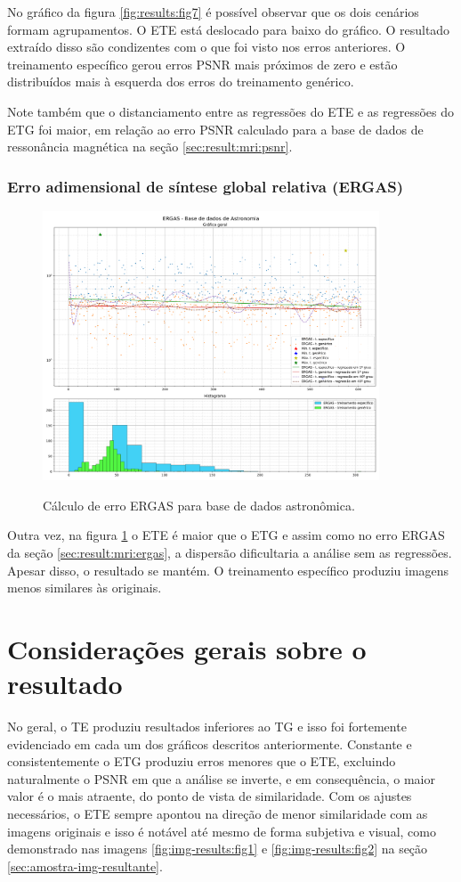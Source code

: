 No gráfico da figura \ref{fig:results:fig7} é possível observar que os dois cenários formam agrupamentos. O ETE está deslocado para baixo do gráfico. O resultado extraído disso são condizentes com o que foi visto nos erros anteriores. O treinamento específico gerou erros PSNR mais próximos de zero e estão distribuídos mais à esquerda dos erros do treinamento genérico.

Note também que o distanciamento entre as regressões do ETE e as regressões do ETG foi maior, em relação ao erro PSNR calculado para a base de dados de ressonância magnética na seção \ref{sec:result:mri:psnr}. 

\subsubsection{Erro adimensional de síntese global relativa (ERGAS)}
\label{sec:result:astronomy:ergas}

\begin{figure}[H]
    \centering
    \caption{Cálculo de erro ERGAS para base de dados astronômica.}
    \includegraphics[width=10cm]{fig/resultados/astronomy/png/ergas_astronomy_compound.png}
    \label{fig:results:fig8}
\end{figure}

Outra vez, na figura \ref{fig:results:fig8} o ETE é maior que o ETG e assim como no erro ERGAS da seção \ref{sec:result:mri:ergas}, a dispersão dificultaria a análise sem as regressões. Apesar disso, o resultado se mantém. O treinamento específico produziu imagens menos similares às originais.

\section{Considerações gerais sobre o resultado}
\label{sec:result:consideracoes-gerais}

No geral, o TE produziu resultados inferiores ao TG e isso foi fortemente evidenciado em cada um dos gráficos descritos anteriormente. Constante e consistentemente o ETG produziu erros menores que o ETE, excluindo naturalmente o PSNR em que a análise se inverte, e em consequência, o maior valor é o mais atraente, do ponto de vista de similaridade. Com os ajustes necessários, o ETE sempre apontou na direção de menor similaridade com as imagens originais e isso é notável até mesmo de forma subjetiva e visual, como demonstrado nas imagens \ref{fig:img-results:fig1} e \ref{fig:img-results:fig2} na seção \ref{sec:amostra-img-resultante}.
